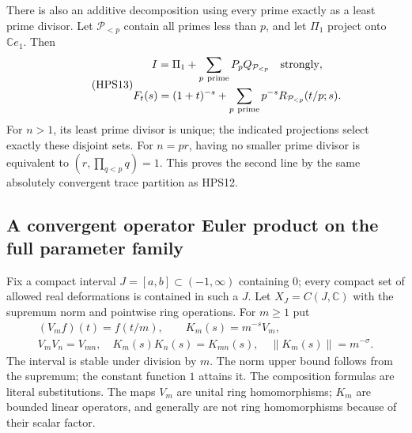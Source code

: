 There is also an additive decomposition using
every prime exactly as a least prime divisor.
Let $\mathcal P_{<p}$ contain all primes less
than $p$, and let $\Pi_1$ project onto $\mathbb C e_1$.
Then
\begin{equation}\tag{HPS13}
\begin{gathered}
 I=\Pi_1+\sum_{p\ {\rm prime}}P_pQ_{\mathcal P_{<p}}
                                \quad\hbox{strongly},\\
 F_t(s)=(1+t)^{-s}
       +\sum_{p\ {\rm prime}}p^{-s}
                    R_{\mathcal P_{<p}}(t/p;s).
\end{gathered}
\end{equation}
For $n>1$, its least prime divisor is unique;
the indicated projections select exactly these
disjoint sets. For $n=pr$, having no smaller
prime divisor is equivalent to $(r,\prod_{q<p}q)=1$.
This proves the second line by the same absolutely
convergent trace partition as HPS12.

\subsection{A convergent operator Euler product on the full parameter family}

Fix a compact interval $J=[a,b]\subset(-1,\infty)$
containing $0$; every compact set of allowed real
deformations is contained in such a $J$.
Let $X_J=C(J,\mathbb C)$ with the supremum norm
and pointwise ring operations. For $m\ge1$ put
\begin{equation}\tag{HPS14}
\begin{gathered}
 (V_mf)(t)=f(t/m),\qquad K_m(s)=m^{-s}V_m,\\
 V_mV_n=V_{mn},\quad K_m(s)K_n(s)=K_{mn}(s),\quad
 \|K_m(s)\|=m^{-\sigma}.
\end{gathered}
\end{equation}
The interval is stable under division by $m$.
The norm upper bound follows from the supremum;
the constant function $1$ attains it. The
composition formulas are literal substitutions.
The maps $V_m$ are unital ring homomorphisms;
$K_m$ are bounded linear operators, and generally
are not ring homomorphisms because of their
scalar factor.

